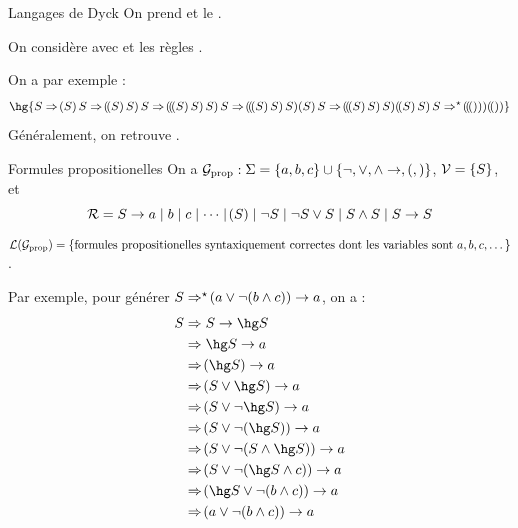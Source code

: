 \documentclass[a4paper,french,bookmarks]{book}
\begin{document}
    \begin{example}{Langages de Dyck}{}
        On prend \hg{$\Sigma = \ens{(,) ,\{,\} ,[,] ,<,>}$} et le .\medskip
        
        On considère  avec  et les règles .
        
        On a par exemple :
        \[ \hg{S \Rightarrow \p{S} S \Rightarrow \p{\p{S} S} S \Rightarrow \p{\p{\p{S} S} S} S \Rightarrow \p{\p{\p{S} S} S} \p{S} S \Rightarrow \p{\p{\p{S} S} S} \p{\p{S} S} S \Rightarrow^\star \p{\p{\p{}}} \p{\p{}}}\]
        Généralement, on retrouve .
    \end{example}
    
    \begin{example}{Formules propositionelles}{}
        On a $\mathcal{G}_\text{prop} : \Sigma = \left\{a, b, c\right\} \cup \left\{\neg, \lor, \land \rightarrow, (, )\right\}$, $\mathcal{V} = \left\{S\right\}$, et 
        \[ \mathcal{R} = S \rightarrow a \mid b \mid c \mid \dots \mid \!\left(S\right) \mid \neg S \mid \neg S \lor S \mid S \land S \mid S \rightarrow S\]
        $\mathcal{L}\!\left(\mathcal{G}_\text{prop}\right) = \left\{\text{formules propositionelles syntaxiquement correctes dont les variables sont} \ a, b, c, \dots\right\}$.\medskip
        
        Par exemple, pour générer $S \Rightarrow^\star \!\left(a \lor \neg \!\left(b \land c\right)\right) \rightarrow a$, on a :
        \begin{align*}
            S &\Rightarrow S \rightarrow \hg S\\
            &\Rightarrow \hg S \rightarrow a\\
            &\Rightarrow \p{\hg S} \rightarrow a\\
            &\Rightarrow \p{S \lor \hg S} \rightarrow a\\
            &\Rightarrow \p{S \lor \neg \hg S} \rightarrow a\\
            &\Rightarrow \p{S \lor \neg \p{\hg S}} \rightarrow a\\
            &\Rightarrow \p{S \lor \neg \p{S \land \hg S}} \rightarrow a\\
            &\Rightarrow \p{S \lor \neg \p{\hg S \land c}} \rightarrow a\\
            &\Rightarrow \p{\hg S \lor \neg \p{b \land c}} \rightarrow a\\
            &\Rightarrow \p{a \lor \neg \p{b \land c}} \rightarrow a
        \end{align*}
    \end{example}
    
\end{document}
